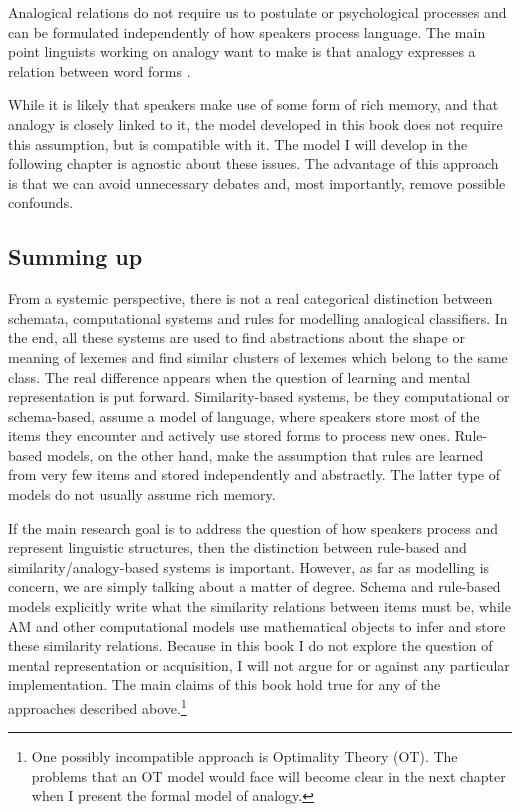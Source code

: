Analogical relations do not require us to postulate  or psychological processes and can be formulated independently of how speakers process language. The main point linguists working on analogy want to make is that analogy expresses a relation between word forms \autocite[11]{Becker.1990}.

While it is likely that speakers make use of some form of rich memory, and that analogy is closely linked to it, the model developed in this book does not require this assumption, but is compatible with it. The model I will develop in the following chapter is agnostic about these issues. The advantage of this approach is that we can avoid unnecessary debates and, most importantly, remove possible confounds.

\subsection{Summing up}

From a systemic perspective, there is not a real categorical distinction between schemata, computational systems and rules for modelling analogical classifiers. In the end, all these systems are used to find abstractions about the shape or meaning of lexemes and find similar clusters of lexemes which belong to the same class. The real difference appears when the question of learning and mental representation is put forward. Similarity-based systems, be they computational or schema-based, assume a  model of language, where speakers store most of the items they encounter and actively use stored forms to process new ones. Rule-based models, on the other hand, make the assumption that rules are learned from very few items and stored independently and abstractly. The latter type of models do not usually assume rich memory.

If the main research goal is to address the question of how speakers process and represent linguistic structures, then the distinction between rule-based and similarity/analogy-based systems is important. However, as far as modelling is concern, we are simply talking about a matter of degree. Schema and rule-based  models explicitly write what the similarity relations between items must be, while AM and other computational models use mathematical objects to infer and store these similarity relations. Because in this book I do not explore the question of mental representation or acquisition, I will not argue for or against any particular implementation. The main claims of this book hold true for any of the approaches described above.\footnote{One possibly incompatible approach is Optimality Theory (OT). The problems that an OT model would face will become clear in the next chapter when I present the formal model of analogy.}

